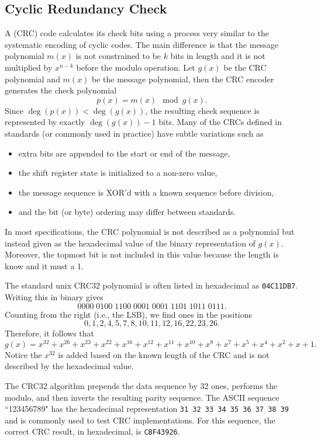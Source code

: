 \subsection{Cyclic Redundancy Check}

A  (CRC) code calculates its check bits using a process very similar to the systematic encoding of cyclic codes.
The main difference is that the message polynomial $m(x)$ is not constrained to be $k$ bits in length and it is not multiplied by $x^{n-k}$ before the modulo operation.
Let $g(x)$ be the CRC polynomial and $m(x)$ be the message polynomial, then the CRC encoder generates the check polynomial
\[ p(x) = m(x) \mod g(x). \]
Since  $\deg \left(p(x)\right) < \deg \left(g(x)\right)$, the resulting check sequence is represented by exactly $\deg \left(g(x)\right)-1$ bits.
Many of the CRCs defined in standards (or commonly used in practice) have subtle variations such as
\begin{itemize}
\item extra bits are appended to the start or end of the message,
\item the shift register state is initialized to a non-zero value,
\item the message sequence is XOR'd with a known sequence before division,
\item and the bit (or byte) ordering may differ between standards.
\end{itemize}

In most specifications, the CRC polynomial is not described as a polynomial but instead given as the hexadecimal value of the binary representation of $g(x)$.
Moreover, the topmost bit is not included in this value because the length is know and it must a 1.
\begin{example}
The standard unix CRC32 polynomial is often listed in hexadecimal as \texttt{04C11DB7}.
Writing this in binary gives
\[ 0000\;0100\;1100\;0001\;0001\;1101\;1011\;0111. \]
Counting from the right (i.e., the LSB), we find ones in the positions
\[ 0,1,2,4,5,7,8,10,11,12,16,22,23,26. \]
Therefore, it follows that
\[ g(x) = x^{32} + x^{26} + x^{23} + x^{22} + x^{16} + x^{12} + x^{11} + x^{10} + x^8 + x^7 + x^5 + x^4 + x^2 + x + 1.\]
Notice the $x^{32}$ is added based on the known length of the CRC and is not described by the hexadecimal value.
\end{example}

The CRC32 algorithm prepends the data sequence by 32 ones, performs the modulo, and then inverts the resulting parity sequence.
The ASCII sequence ``123456789" has the hexadecimal representation \texttt{31\,32\,33\,34\,35\,36\,37\,38\,39} and is commonly used to test CRC implementations.
For this sequence, the correct CRC result, in hexadecimal, is \texttt{CBF43926}.


